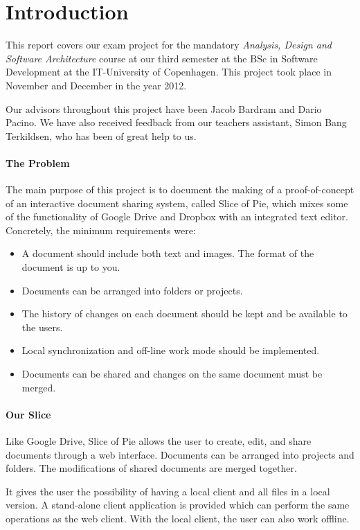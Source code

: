 \section{Introduction}
This report covers our exam project for the mandatory \emph{Analysis, Design and Software Architecture}
course at our third semester at the BSc in Software Development at the IT-University of Copenhagen.
This project took place in November and December in the year 2012. 

Our advisors throughout this project have been Jacob Bardram and Dario Pacino. We have also received feedback from
our teachers assistant, Simon Bang Terkildsen, who has been of great help to us.

\paragraph{The Problem}
The main purpose of this project is to document the making of a proof-of-concept of an interactive document
sharing system, called Slice of Pie, which mixes some of the functionality of Google Drive and Dropbox with
an integrated text editor.
Concretely, the minimum requirements were:
\begin{itemize}
\item A document should include both text and images. The format of the document is up to you.
\item Documents can be arranged into folders or projects.
\item The history of changes on each document should be kept and be available to the users.
\item Local synchronization and off-line work mode should be implemented.
\item Documents can be shared and changes on the same document must be merged.
\end{itemize}
\paragraph{Our Slice}
Like Google Drive, Slice of Pie allows the user to create, edit, and share documents through a web interface.
Documents can be arranged into projects and folders. The modifications of shared documents are merged together.

It gives the user the possibility of having a local client and all files in a local version. A stand-alone client
application is provided which can perform the same operations as the web client. With the local client, the user
can also work offline.

